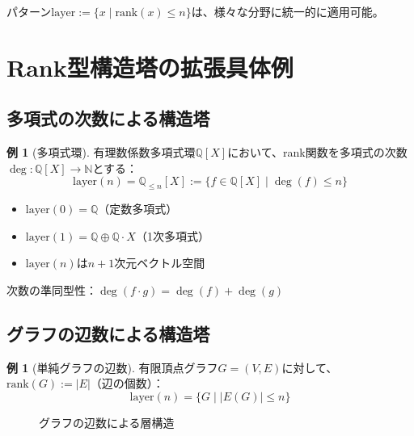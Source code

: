 \documentclass[a4paper,12pt]{ltjsarticle}
\theoremstyle{definition}
\newtheorem{example}[definition]{例}
\begin{document}
パターン$\text{layer} := \{x \mid \text{rank}(x) \leq n\}$は、様々な分野に統一的に適用可能。

\section{Rank型構造塔の拡張具体例}\label{sec:rank_extended}

\subsection{多項式の次数による構造塔}

\begin{example}[多項式環]
有理数係数多項式環$\mathbb{Q}[X]$において、rank関数を多項式の次数$\deg: \mathbb{Q}[X] \to \mathbb{N}$とする：
$$\text{layer}(n) = \mathbb{Q}_{\leq n}[X] := \{f \in \mathbb{Q}[X] \mid \deg(f) \leq n\}$$
\end{example}

\begin{itemize}
\item $\text{layer}(0) = \mathbb{Q}$（定数多項式）
\item $\text{layer}(1) = \mathbb{Q} \oplus \mathbb{Q} \cdot X$（1次多項式）
\item $\text{layer}(n)$は$n+1$次元ベクトル空間
\end{itemize}

次数の準同型性：$\deg(f \cdot g) = \deg(f) + \deg(g)$

\subsection{グラフの辺数による構造塔}

\begin{example}[単純グラフの辺数]
有限頂点グラフ$G = (V, E)$に対して、$\text{rank}(G) := |E|$（辺の個数）：
$$\text{layer}(n) = \{G \mid |E(G)| \leq n\}$$
\end{example}

\begin{figure}[h]
\centering
{}
\caption{グラフの辺数による層構造}
\end{figure}
\end{document}
